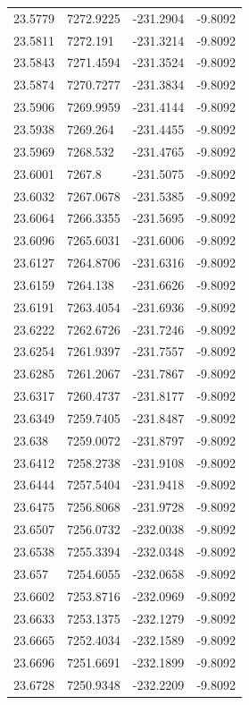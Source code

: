 \begin{table}[H]
\begin{tabular}{llll}
23.5779 & 7272.9225 & -231.2904 & -9.8092 \\
23.5811 & 7272.191 & -231.3214 & -9.8092 \\
23.5843 & 7271.4594 & -231.3524 & -9.8092 \\
23.5874 & 7270.7277 & -231.3834 & -9.8092 \\
23.5906 & 7269.9959 & -231.4144 & -9.8092 \\
23.5938 & 7269.264 & -231.4455 & -9.8092 \\
23.5969 & 7268.532 & -231.4765 & -9.8092 \\
23.6001 & 7267.8 & -231.5075 & -9.8092 \\
23.6032 & 7267.0678 & -231.5385 & -9.8092 \\
23.6064 & 7266.3355 & -231.5695 & -9.8092 \\
23.6096 & 7265.6031 & -231.6006 & -9.8092 \\
23.6127 & 7264.8706 & -231.6316 & -9.8092 \\
23.6159 & 7264.138 & -231.6626 & -9.8092 \\
23.6191 & 7263.4054 & -231.6936 & -9.8092 \\
23.6222 & 7262.6726 & -231.7246 & -9.8092 \\
23.6254 & 7261.9397 & -231.7557 & -9.8092 \\
23.6285 & 7261.2067 & -231.7867 & -9.8092 \\
23.6317 & 7260.4737 & -231.8177 & -9.8092 \\
23.6349 & 7259.7405 & -231.8487 & -9.8092 \\
23.638 & 7259.0072 & -231.8797 & -9.8092 \\
23.6412 & 7258.2738 & -231.9108 & -9.8092 \\
23.6444 & 7257.5404 & -231.9418 & -9.8092 \\
23.6475 & 7256.8068 & -231.9728 & -9.8092 \\
23.6507 & 7256.0732 & -232.0038 & -9.8092 \\
23.6538 & 7255.3394 & -232.0348 & -9.8092 \\
23.657 & 7254.6055 & -232.0658 & -9.8092 \\
23.6602 & 7253.8716 & -232.0969 & -9.8092 \\
23.6633 & 7253.1375 & -232.1279 & -9.8092 \\
23.6665 & 7252.4034 & -232.1589 & -9.8092 \\
23.6696 & 7251.6691 & -232.1899 & -9.8092 \\
23.6728 & 7250.9348 & -232.2209 & -9.8092 \\

\end{tabular}
\end{table}
